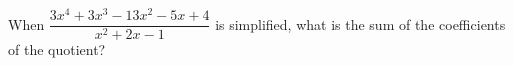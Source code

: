 When $\dfrac{3x^4+3x^3-13x^2-5x+4}{x^2+2x-1}$ is simplified, what is the sum of the coefficients of the quotient?
